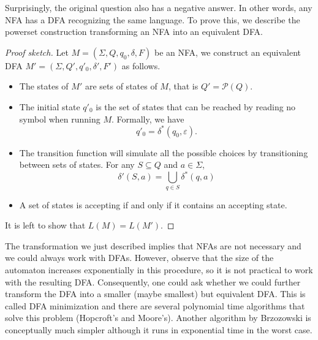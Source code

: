 \documentclass{article}
\theoremstyle{definition}
\theoremstyle{remark}
\newcommand{\mP}{\mathcal{P}}
\begin{document}
Surprisingly, the original question also has a negative answer. In other words, any NFA has a DFA recognizing the same language. To prove this, we describe the powerset construction transforming an NFA into an equivalent DFA.

\begin{proof}[Proof sketch]
	Let $M = (\Sigma, Q, q_0, \delta, F)$ be an NFA, we construct an equivalent DFA $M' = (\Sigma, Q', q'_0, \delta', F')$ as follows.
	\begin{itemize}
		\item The states of $M'$ are sets of states of $M$, that is $Q' = \mP(Q)$.
		\item The initial state $q'_0$ is the set of states that can be reached by reading no symbol when running $M$. Formally, we have 
		\[q'_0 = \delta^*(q_0, \varepsilon).\]
		\item The transition function will simulate all the possible choices by transitioning between sets of states. For any $S \subseteq Q$ and $a \in \Sigma$,
		\[\delta'(S, a) = \bigcup_{q \in S} \delta^*(q,a)\]
		\item A set of states is accepting if and only if it contains an accepting state. 
	\end{itemize}
	It is left to show that $L(M) = L(M')$.
\end{proof}

The transformation we just described implies that NFAs are not necessary and we could always work with DFAs. However, observe that the size of the automaton increases exponentially in this procedure, so it is not practical to work with the resulting DFA. Consequently, one could ask whether we could further transform the DFA into a smaller (maybe smallest) but equivalent DFA. This is called DFA minimization and there are several polynomial time algorithms that solve this problem (Hopcroft's and Moore's). Another algorithm by Brzozowski is conceptually much simpler although it runs in exponential time in the worst case.
\end{document}
